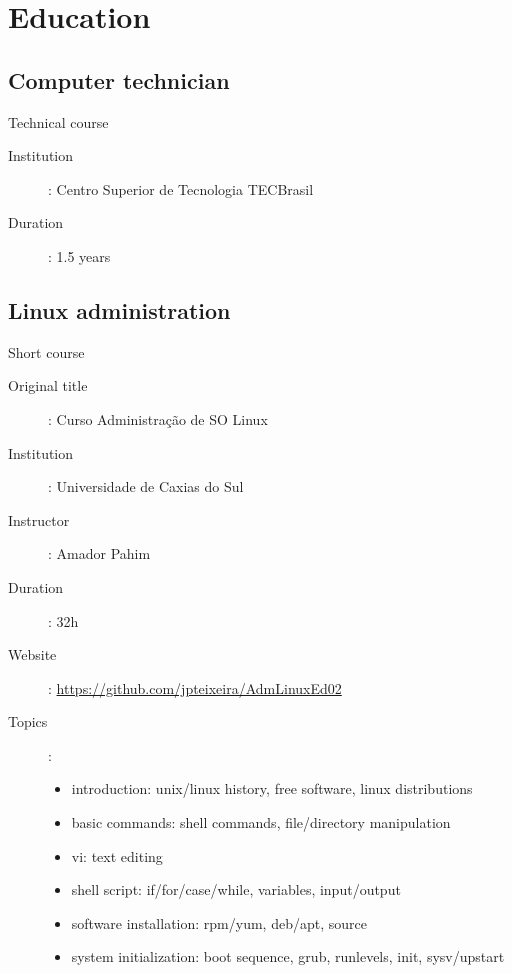 \section*{Education}
\subsection*{Computer technician}

Technical course

\begin{description}
    \item[Institution]: Centro Superior de Tecnologia TECBrasil
    \item[Duration]: 1.5 years
\end{description}

\subsection*{Linux administration}

Short course

\begin{description}
    \item[Original title]: Curso Administração de SO Linux
    \item[Institution]: Universidade de Caxias do Sul
    \item[Instructor]: Amador Pahim
    \item[Duration]: 32h
    \item[Website]: \url{https://github.com/jpteixeira/AdmLinuxEd02}
    \item[Topics]:
        \begin{itemize}
            \item
                introduction: unix/linux history, free software, linux
                distributions
            \item basic commands: shell commands, file/directory manipulation
            \item vi: text editing
            \item shell script: if/for/case/while, variables, input/output
            \item software installation: rpm/yum, deb/apt, source
            \item
                system initialization: boot sequence, grub, runlevels, init,
                sysv/upstart
        \end{itemize}
\end{description}

